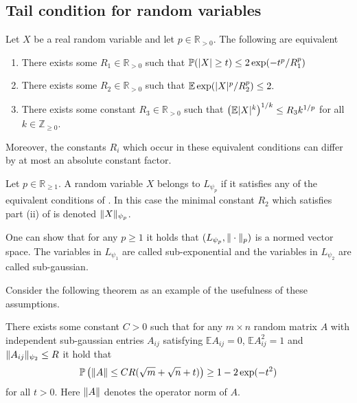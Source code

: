 \subsection{Tail condition for random variables}\label{sec: SubGSubE}
\begin{theorem}{\cite[Proof of Proposition 2.5.2]{vershynin2018high}}\label{thm: EquivalentLp}
  Let $X$ be a real random variable and let $p\in \mathbb{R}_{>0}$. The following are equivalent
  \begin{enumerate}[label = (\roman*)]
    \item There exists some $R_1\in \mathbb{R}_{>0}$ such that $\mathbb{P}(\vert X \vert\geq t) \leq 2\exp(-t^p/R_1^p)$
    \item There exists some $R_2\in \mathbb{R}_{>0}$ such that $\mathbb{E}\exp(\vert X \vert^p/R_2^p) \leq 2.$
    \item There exists some constant $R_3\in \mathbb{R}_{>0}$ such that $\left(\mathbb{E} \vert X \vert^k \right)^{1/k} \leq R_3k^{1/p}$
    for all $k\in \mathbb{Z}_{\geq 0}$.
  \end{enumerate}
  Moreover, the constants $R_i$ which occur in these equivalent conditions can differ by at most an absolute constant factor.
\end{theorem}
\begin{definition}
  Let $p\in \mathbb{R}_{\geq 1}$.
  A random variable $X$ belongs to $L_{\psi_p}$ if it satisfies any of the equivalent conditions of .
  In this case the minimal constant $R_2$ which satisfies part (ii) of  is denoted $\Vert X \Vert_{\psi_p}$.
\end{definition}
\begin{remark}
  One can show that for any $p\geq 1$ it holds that $(L_{\psi_p},\Vert \cdot \Vert_p)$ is a normed vector space.
  The variables in $L_{\psi_1}$ are called sub-exponential and the variables in $L_{\psi_2}$ are called sub-gaussian.
\end{remark}
Consider the following theorem as an example of the usefulness of these assumptions.
\begin{theorem}{\cite[Theorem 4.4.5]{vershynin2018high}}
  There exists some constant $C>0$ such that for any  $m\times n$ random matrix $A$ with independent sub-gaussian entries $A_{ij}$ satisfying $\mathbb{E}A_{ij} = 0$, $\mathbb{E}A_{ij}^2 = 1$ and $\Vert A_{ij} \Vert_{\psi_2}\leq R$
  it hold that
  $$\mathbb{P}\left(\Vert A \Vert \leq  CR(\sqrt{m} + \sqrt{n} + t)\right) \geq 1-2\exp(-t^2)$$
  for all $t>0$.
  Here $\Vert A \Vert$ denotes the operator norm of $A$.
\end{theorem}
